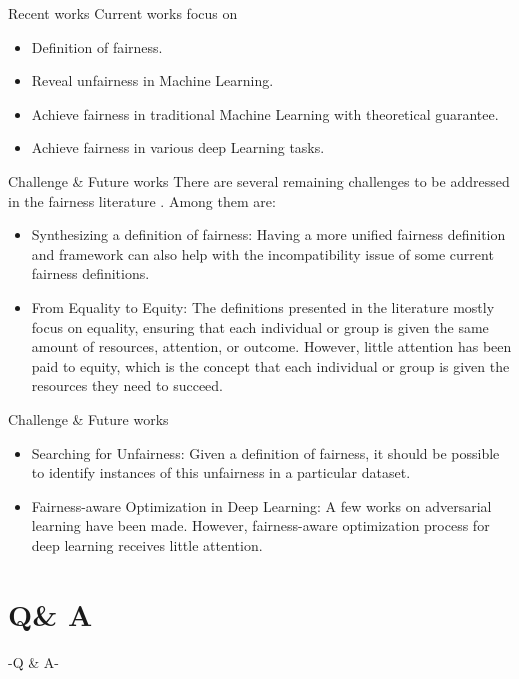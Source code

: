 \documentclass[10pt, xcolor=table,aspectratio=169]{beamer}
\begin{document}
\begin{frame}{Recent works}
	Current works focus on
	\begin{itemize}
		\item Definition of fairness.
		\item Reveal unfairness in Machine Learning.
		\item Achieve fairness in traditional Machine Learning with theoretical guarantee.
		\item Achieve fairness in various deep Learning tasks.
	\end{itemize}
\end{frame}


\begin{frame}{Challenge \& Future works}
	There are several remaining challenges to be addressed in the fairness literature \cite{mehrabi2021survey}. Among them are:
	\begin{itemize}
		\item Synthesizing a definition of fairness: Having a more unified fairness definition and framework can also help with the incompatibility issue of some current fairness definitions.
		\item From Equality to Equity: The definitions presented in the literature mostly focus on equality, ensuring that each individual or group is given the same amount of resources, attention, or outcome. However, little attention has been paid to equity, which is the concept that each	 individual or group is given the resources they need to succeed.
	\end{itemize}
\end{frame}

\begin{frame}{Challenge \& Future works}
	\begin{itemize}
		\item Searching for Unfairness: Given a definition of fairness, it should be possible to identify instances of this unfairness in a particular dataset.
		\item Fairness-aware Optimization in Deep Learning: A few works on adversarial learning have been made. However, fairness-aware optimization process for deep learning receives little attention.
	\end{itemize}
\end{frame}

\section{Q\& A}
\begin{frame}
	\Huge{\centerline{-Q \& A-}}
\end{frame}
\end{document}
